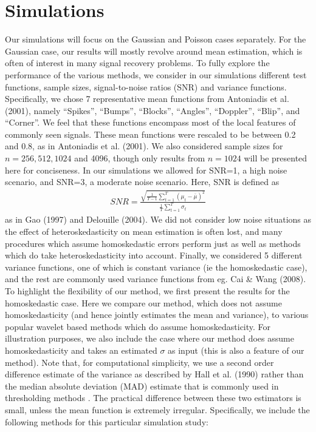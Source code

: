 \documentclass[12pt]{article}
\newcommand{\s}{\sigma}
\begin{document}
\section{Simulations}
Our simulations will focus on the Gaussian and Poisson cases separately. For the Gaussian case, our results will mostly revolve around mean estimation, which is often of interest in many signal recovery problems. To fully explore the performance of the various methods, we consider in our simulations different test functions, sample sizes, signal-to-noise ratios (SNR) and variance functions. Specifically, we chose 7 representative mean functions from Antoniadis et al. (2001), namely ``Spikes'', ``Bumps'', ``Blocks'', ``Angles'', ``Doppler'', ``Blip'', and ``Corner''. We feel that these functions encompass most of the local features of commonly seen signals. These mean functions were rescaled to be between 0.2 and 0.8, as in Antoniadis et al. (2001). We also considered sample sizes for $n=256,512,1024$ and 4096, though only results from $n=1024$ will be presented here for conciseness. In our simulations we allowed for SNR=1, a high noise scenario, and SNR=3, a moderate noise scenario. Here, SNR is defined as
\begin{eqnarray}\label{eq:snr}
SNR=\frac{\sqrt{\frac{1}{T-1}\sum_{t=1}^T(\mu_t-\bar{\mu})^2}}{\frac{1}{T}\sum_{t=1}^T\s_t}
\end{eqnarray}
as in Gao (1997) and Delouille (2004). We did not consider low noise situations as the effect of heteroskedasticity on mean estimation is often lost, and many procedures which assume homoskedastic errors perform just as well as methods which do take heteroskedasticity into account. Finally, we considered 5 different variance functions, one of which is constant variance (ie the homoskedastic case), and the rest are commonly used variance functions from eg. Cai \& Wang (2008).\bigskip\\
To highlight the flexibility of our method, we first present the results for the homoskedastic case. Here we compare our method, which does not assume homoskedasticity (and hence jointly estimates the mean and variance), to various popular wavelet based methods which do assume homoskedasticity. For illustration purposes, we also include the case where our method does assume homoskedasticity and takes an estimated $\s$ as input (this is also a feature of our method). Note that, for computational simplicity, we use a second order difference estimate of the variance as described by Hall et al. (1990) rather than the median absolute deviation (MAD) estimate that is commonly used in thresholding methods . The practical difference between these two estimators is small, unless the mean function is extremely irregular. Specifically, we include the following methods for this particular simulation study:
\end{document}
